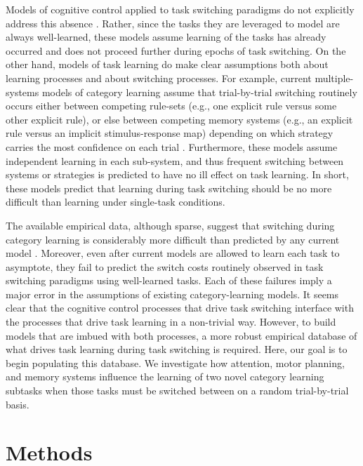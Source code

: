 \documentclass[doc, floatsintext]{apa7}
\begin{document}
Models of cognitive control applied to task switching
paradigms do not explicitly address this absence
\parencite{botvinick_conflict_2001,
    blais_item-specific_2007, verguts_hebbian_2008,
abrahamse_grounding_2016}. Rather, since the tasks they are
leveraged to model are always well-learned, these models
assume learning of the tasks has already occurred and does
not proceed further during epochs of task switching. On the
other hand, models of task learning do make clear
assumptions both about learning processes and about
switching processes. For example, current multiple-systems
models of category learning assume that trial-by-trial
switching routinely occurs either between competing
rule-sets (e.g., one explicit rule versus some other
explicit rule), or else between competing memory systems
(e.g., an explicit rule versus an implicit stimulus-response
map) depending on which strategy carries the most confidence
on each trial \parencite{ashby_neuropsychological_1998,
erickson_rules_1998}. Furthermore, these models assume
independent learning in each sub-system, and thus frequent
switching between systems or strategies is predicted to have
no ill effect on task learning. In short, these models
predict that learning during task switching should be no
more difficult than learning under single-task conditions.

The available empirical data, although sparse, suggest that
switching during category learning is considerably more
difficult than predicted by any current model
\parencite{crossley_trial-by-trial_2018,
erickson_executive_2008, helie_categorization_2018}.
Moreover, even after current models are allowed to learn
each task to asymptote, they fail to predict the switch
costs routinely observed in task switching paradigms using
well-learned tasks. Each of these failures imply a major
error in the assumptions of existing category-learning
models. It seems clear that the cognitive control processes
that drive task switching interface with the processes that
drive task learning in a non-trivial way. However, to build
models that are imbued with both processes, a more robust
empirical database of what drives task learning during task
switching is required. Here, our goal is to begin populating
this database. We investigate how attention, motor planning,
and memory systems influence the learning of two novel
category learning subtasks when those tasks must be switched
between on a random trial-by-trial basis.

\section{Methods}
\end{document}
